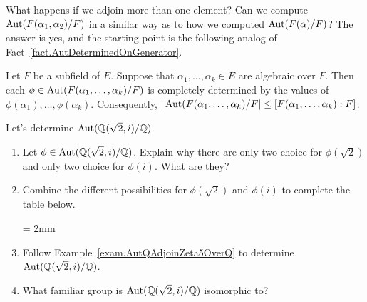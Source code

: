 What happens if we adjoin more than one element? Can we compute $\operatorname{Aut}(F(\alpha_1,\alpha_2)/F)$ in a similar way as to how we computed $\operatorname{Aut}(F(\alpha)/F)$? The answer is yes, and the starting point is the following analog of Fact~\ref{fact.AutDeterminedOnGenerator}.

\begin{fact}
Let $F$ be a subfield of $E$. Suppose that $\alpha_1,\ldots,\alpha_k\in E$ are algebraic over $F$. Then each $\phi\in \operatorname{Aut}({F}(\alpha_1,\ldots,\alpha_k)/F)$ is completely determined by the values of $\phi(\alpha_1),\ldots,\phi(\alpha_k)$. Consequently,  $|\operatorname{Aut}({F}(\alpha_1,\ldots,\alpha_k)/F|\le  [F(\alpha_1,\ldots,\alpha_k):F]$.
\end{fact}

\begin{problem}\label{prob.AutQAdjoinSqrt2AndiOverQ}
Let's determine $\operatorname{Aut}(\mathbb{Q}(\sqrt{2},i)/\mathbb{Q})$.
\begin{enumerate}
\item Let $\phi\in  \operatorname{Aut}(\mathbb{Q}(\sqrt{2},i)/\mathbb{Q})$. Explain why there are only two choice for $\phi(\sqrt{2})$ and only two choice for $\phi(i)$. What are they?
\item Combine the different possibilities for $\phi(\sqrt{2})$ and $\phi(i)$ to complete the table below.
\begin{center}
\tabulinesep = 2mm
\end{center}
\item Follow Example~\ref{exam.AutQAdjoinZeta5OverQ} to determine $\operatorname{Aut}(\mathbb{Q}(\sqrt{2},i)/\mathbb{Q})$.
\item What familiar group is  $\operatorname{Aut}(\mathbb{Q}(\sqrt{2},i)/\mathbb{Q})$ isomorphic to?
\end{enumerate}
\end{problem}

